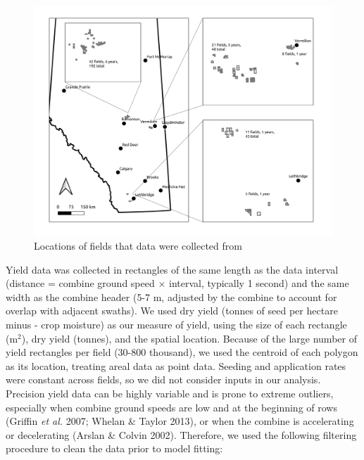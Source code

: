 \documentclass[]{elsarticle} %
\begin{document}
\begin{figure}
\includegraphics[width=1\linewidth]{../Figures/Field Locations} \caption{Locations of fields that data were collected from}\label{fig:fieldLocataions}
\end{figure}

Yield data was collected in rectangles of the same length as the data interval (distance = combine ground speed \(\times\) interval, typically 1 second) and the same width as the combine header (5-7 m, adjusted by the combine to account for overlap with adjacent swaths).
We used dry yield (tonnes of seed per hectare minus - crop moisture) as our measure of yield, using the size of each rectangle (m\(^2\)), dry yield (tonnes), and the spatial location.
Because of the large number of yield rectangles per field (30-800 thousand), we used the centroid of each polygon as its location, treating areal data as point data.
Seeding and application rates were constant across fields, so we did not consider inputs in our analysis.
Precision yield data can be highly variable and is prone to extreme outliers, especially when combine ground speeds are low and at the beginning of rows (Griffin \emph{et al.} 2007; Whelan \& Taylor 2013), or when the combine is accelerating or decelerating (Arslan \& Colvin 2002).
Therefore, we used the following filtering procedure to clean the data prior to model fitting:
\end{document}
